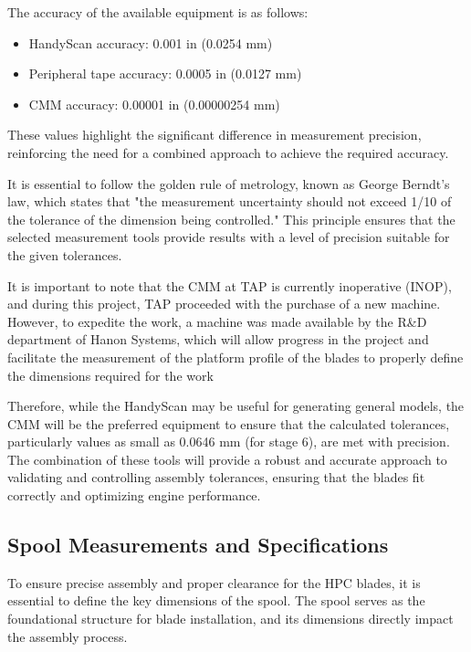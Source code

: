 The accuracy of the available equipment is as follows:  

\begin{itemize}
    \item HandyScan accuracy: 0.001 in (0.0254 mm)
    \item Peripheral tape accuracy: 0.0005 in (0.0127 mm)
    \item CMM accuracy: 0.00001 in (0.00000254 mm)
\end{itemize}

These values highlight the significant difference in measurement precision, reinforcing the need for a combined approach to achieve the required accuracy.

It is essential to follow the golden rule of metrology, known as George Berndt's law, which states that "the measurement uncertainty should not exceed 1/10 of the tolerance of the dimension being controlled." This principle ensures that the selected measurement tools provide results with a level of precision suitable for the given tolerances.

It is important to note that the CMM at TAP is currently inoperative (INOP), and during this project, TAP proceeded with the purchase of a new machine. However, to expedite the work, a machine was made available by the R\&D department of Hanon Systems, which will allow progress in the project and facilitate the measurement of the platform profile of the blades to properly define the dimensions required for the work

Therefore, while the HandyScan may be useful for generating general models, the CMM will be the preferred equipment to ensure that the calculated tolerances, particularly values as small as 0.0646 mm (for stage 6), are met with precision. The combination of these tools will provide a robust and accurate approach to validating and controlling assembly tolerances, ensuring that the blades fit correctly and optimizing engine performance.

\subsection{Spool Measurements and Specifications}
\label{subsec:spool_measurements}

To ensure precise assembly and proper clearance for the HPC blades, it is essential to define the key dimensions of the spool. The spool serves as the foundational structure for blade installation, and its dimensions directly impact the assembly process. 


